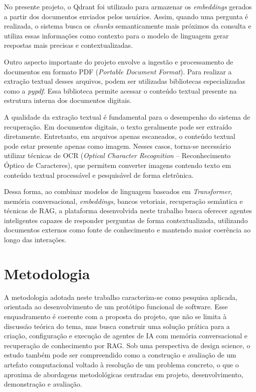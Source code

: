 \documentclass[12pt, openright, oneside, a4paper, brazil]{ads-unipac-abntex2}
\begin{document}
No presente projeto, o Qdrant foi utilizado para armazenar os \textit{embeddings} gerados a partir dos documentos enviados pelos usuários. Assim, quando uma pergunta é realizada, o sistema busca os \textit{chunks} semanticamente mais próximos da consulta e utiliza essas informações como contexto para o modelo de linguagem gerar respostas mais precisas e contextualizadas.

Outro aspecto importante do projeto envolve a ingestão e processamento de documentos em formato PDF (\textit{Portable Document Format}). Para realizar a extração textual desses arquivos, podem ser utilizadas bibliotecas especializadas como a \textit{pypdf}. Essa biblioteca permite acessar o conteúdo textual presente na estrutura interna dos documentos digitais.

A qualidade da extração textual é fundamental para o desempenho do sistema de recuperação. Em documentos digitais, o texto geralmente pode ser extraído diretamente. Entretanto, em arquivos apenas escaneados, o conteúdo textual pode estar presente apenas como imagem. Nesses casos, torna-se necessário utilizar técnicas de OCR (\textit{Optical Character Recognition} -- Reconhecimento Óptico de Caracteres), que permitem converter imagens contendo texto em conteúdo textual processável e pesquisável de forma eletrônica.

Dessa forma, ao combinar modelos de linguagem baseados em \textit{Transformer}, memória conversacional, \textit{embeddings}, bancos vetoriais, recuperação semântica e técnicas de RAG, a plataforma desenvolvida neste trabalho busca oferecer agentes inteligentes capazes de responder perguntas de forma contextualizada, utilizando documentos externos como fonte de conhecimento e mantendo maior coerência ao longo das interações.

\chapter[Metodologia]{Metodologia}
A metodologia adotada neste trabalho caracteriza-se como pesquisa aplicada, orientada ao desenvolvimento de um protótipo funcional de software. Esse enquadramento é coerente com a proposta do projeto, que não se limita à discussão teórica do tema, mas busca construir uma solução prática para a criação, configuração e execução de agentes de IA com memória conversacional e recuperação de conhecimento por RAG. Sob uma perspectiva de design science, o estudo também pode ser compreendido como a construção e avaliação de um artefato computacional voltado à resolução de um problema concreto, o que o aproxima de abordagens metodológicas centradas em projeto, desenvolvimento, demonstração e avaliação. 
\end{document}
